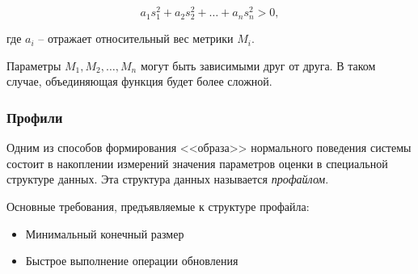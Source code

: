 \begin{equation}
	a_1s_1^2 + a_2s_2^2 + \dots + a_ns_n^2 > 0,
\end{equation}

где $a_i$ -- отражает относительный вес метрики $M_i$.

Параметры $M_1, M_2, \dots, M_n$ могут быть зависимыми друг от друга. В таком случае, объединяющая функция будет более сложной.

\subsubsection*{Профили}

Одним из способов формирования <<образа>> нормального поведения системы состоит в накоплении измерений значения параметров оценки в специальной структуре данных. Эта структура данных называется \textit{профайлом}. 

Основные требования, предъявляемые к структуре профайла:
\begin{itemize}
	\item Минимальный конечный размер
	\item Быстрое выполнение операции обновления
\end{itemize}

